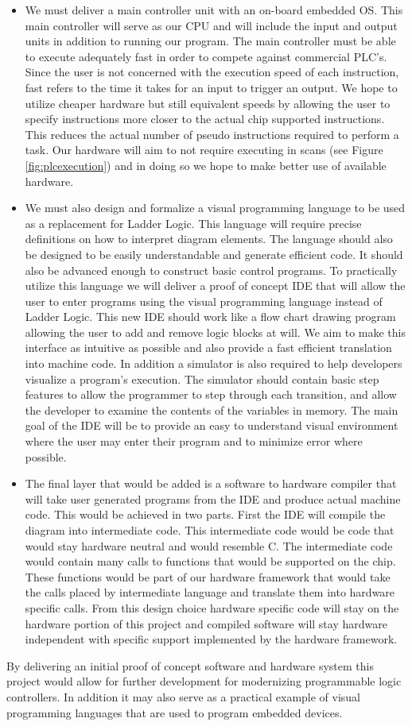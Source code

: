 \begin{itemize}
\item We must deliver a main controller unit with an on-board embedded OS. This main controller will serve as our CPU and will include the input and output units in addition to running our program. The main controller must be able to execute adequately fast in order to compete against commercial PLC's. Since the user is not concerned with the execution speed of each instruction, fast refers to the time it takes for an input to trigger an output. We hope to utilize cheaper hardware but still equivalent speeds by allowing the user to specify instructions more closer to the actual chip supported instructions. This reduces the actual number of pseudo instructions required to perform a task. Our hardware will aim to not require executing in scans (see Figure \ref{fig:plcexecution}) and in doing so we hope to make better use of available hardware.

\item We must also design and formalize a visual programming language to be used as a replacement for Ladder Logic. This language will require precise definitions on how to interpret diagram elements. The language should also be designed to be easily understandable and generate efficient code. It should also be advanced enough to construct basic control programs. To practically utilize this language we will deliver a proof of concept IDE that will allow the user to enter programs using the visual programming language instead of Ladder Logic. This new IDE should work like a flow chart drawing program allowing the user to add and remove logic blocks at will. We aim to make this interface as intuitive as possible and also provide a fast efficient translation into machine code. In addition a simulator is also required to help developers visualize a program's execution. The simulator should contain basic step features to allow the programmer to step through each transition, and allow the developer to examine the contents of the variables in memory. The main goal of the IDE will be to provide an easy to understand visual environment where the user may enter their program and to minimize error where possible.

\item The final layer that would be added is a software to hardware compiler that will take user generated programs from the IDE and produce actual machine code. This would be achieved in two parts. First the IDE will compile the diagram into intermediate code. This intermediate code would be code that would stay hardware neutral and would resemble C. The intermediate code would contain many calls to functions that would be supported on the chip. These functions would be part of our hardware framework that would take the calls placed by intermediate language and translate them into hardware specific calls. From this design choice hardware specific code will stay on the hardware portion of this project and compiled software will stay hardware independent with specific support implemented by the hardware framework.
\end{itemize}

By delivering an initial proof of concept software and hardware system this project would allow for further development for modernizing programmable logic controllers. In addition it may also serve as a practical example of visual programming languages that are used to program embedded devices.